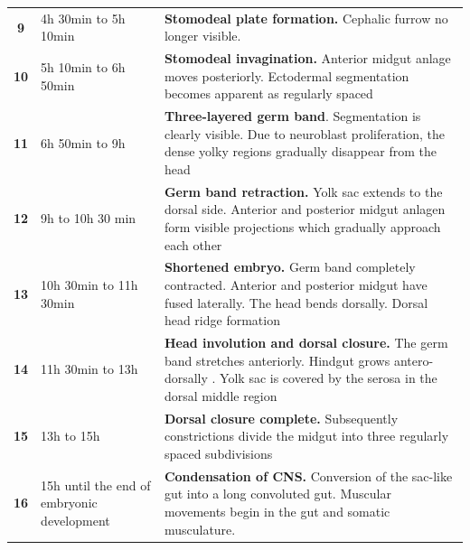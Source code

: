 \begin{table}
\begin{tabular}{|c|p{3.5cm}|p{14cm}|}
%
\textbf{9}	& 4h 30min to 5h 10min	& \textbf{Stomodeal plate formation.} Cephalic furrow no longer visible. 	 	\\
%
\textbf{10}	& 5h 10min to 6h 50min	& \textbf{Stomodeal invagination.} Anterior midgut anlage moves posteriorly. Ectodermal segmentation becomes apparent as regularly spaced	\\
%
\textbf{11}	& 6h 50min to 9h 	& \textbf{Three-layered germ band}. Segmentation is clearly visible. Due to neuroblast proliferation, the dense yolky regions gradually disappear from the head	\\
%
\textbf{12}	& 9h to 10h 30 min	& \textbf{Germ band retraction.} Yolk sac extends to the dorsal side. Anterior and posterior midgut anlagen form visible projections which gradually approach each other	\\
%
\textbf{13}	& 10h 30min to 11h 30min	& \textbf{Shortened embryo.} Germ band completely contracted. Anterior and posterior midgut have fused laterally. The head bends dorsally. Dorsal head ridge formation \\
%
\textbf{14}	& 11h 30min to 13h	& \textbf{Head involution and dorsal closure.} The germ band stretches anteriorly. Hindgut grows antero-dorsally	. Yolk sac is covered by the serosa in the dorsal middle region\\
%
\textbf{15}	& 13h to 15h 	& \textbf{Dorsal closure complete.} Subsequently constrictions divide the midgut into three regularly spaced subdivisions	\\
%
\textbf{16}	& 15h until the end of embryonic development	& \textbf{Condensation of CNS.} Conversion of the sac-like gut into a long convoluted gut. Muscular movements begin in the gut and somatic musculature. 	\\

\hline
\end{tabular}
\end{table}



